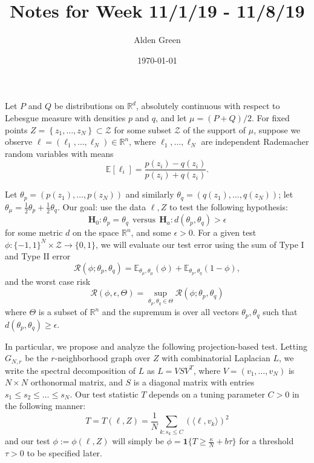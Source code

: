 \documentclass{article}
\newcommand{\Reals}{\mathbb{R}}
\newcommand{\set}[1]{\left\{#1\right\}}
\newcommand{\dotp}[2]{\langle #1, #2 \rangle}
\newcommand{\1}{\mathbf{1}}
\newcommand{\Rd}{\Reals^d}
\theoremstyle{alden}
\theoremstyle{aldenthm}
\theoremstyle{definition}
\theoremstyle{remark}
\begin{document}
\title{Notes for Week 11/1/19 - 11/8/19}
\author{Alden Green}
\date{\today}
\maketitle

Let $P$ and $Q$ be distributions on $\Rd$, absolutely continuous with respect to Lebesgue measure with densities $p$ and $q$, and let $\mu = (P + Q)/2$. For fixed points $Z = \set{z_1,\ldots,z_N} \subset \mathcal{Z}$ for some subset $\mathcal{Z}$ of the support of $\mu$, suppose we observe $\ell = (\ell_1,\ldots,\ell_N) \in \Reals^n$, where $\ell_1,\ldots,\ell_N$ are independent Rademacher random variables with means
\begin{equation*}
\mathbb{E}[\ell_i] = \frac{p(z_i) - q(z_i)}{p(z_i) + q(z_i)}.
\end{equation*}

Let $\theta_p = (p(z_1),\ldots,p(z_N))$ and similarly $\theta_q = (q(z_1),\ldots,q(z_N))$; let $\theta_{\mu} = \frac{1}{2}\theta_p + \frac{1}{2}\theta_q$. Our goal: use the data $\ell,Z$ to test the following hypothesis:
\begin{equation*}
\textbf{H}_0: \theta_p = \theta_q ~~\textrm{versus}~~ \textbf{H}_a: d(\theta_p,\theta_q) > \epsilon 
\end{equation*}
for some metric $d$ on the space $\Reals^n$, and some $\epsilon > 0$. For a given test $\phi: \{-1,1\}^N \times \mathcal{Z} \to \{0,1\}$, we will evaluate our test error using the sum of Type I and Type II error
\begin{equation*}
\mathcal{R}(\phi;\theta_p,\theta_q) = \mathbb{E}_{\theta_\mu,\theta_\mu}(\phi) + \mathbb{E}_{\theta_p,\theta_q}(1 - \phi),
\end{equation*}
and the worst case risk
\begin{equation*}
\mathcal{R}(\phi,\epsilon,\Theta) = \sup_{\theta_p,\theta_q \in \Theta} \mathcal{R}(\phi; \theta_p, \theta_q)
\end{equation*}
where $\Theta$ is a subset of $\Reals^n$ and the supremum is over all vectors $\theta_p,\theta_q$ such that $d(\theta_p,\theta_q) \geq \epsilon$. 

In particular, we propose and analyze the following projection-based test. Letting $G_{N,r}$ be the $r$-neighborhood graph over $Z$ with combinatorial Laplacian $L$, we write the spectral decomposition of $L$ as $L = V S V^T$, where $V = (v_1,\ldots,v_N)$ is $N \times N$ orthonormal matrix, and $S$ is a diagonal matrix with entries $s_1 \leq s_2 \leq \ldots \leq s_N$. Our test statistic $T$ depends on a tuning parameter $C > 0$ in the following manner:
\begin{equation*}
T = T(\ell,Z) = \frac{1}{N}\sum_{k: s_k \leq C} \left(\dotp{\ell}{v_k}\right)^2
\end{equation*}
and our test $\phi := \phi(\ell,Z)$ will simply be $\phi = \1\{T \geq \frac{\kappa}{N} + b\tau\}$ for a threshold $\tau > 0$ to be specified later.
\end{document}
